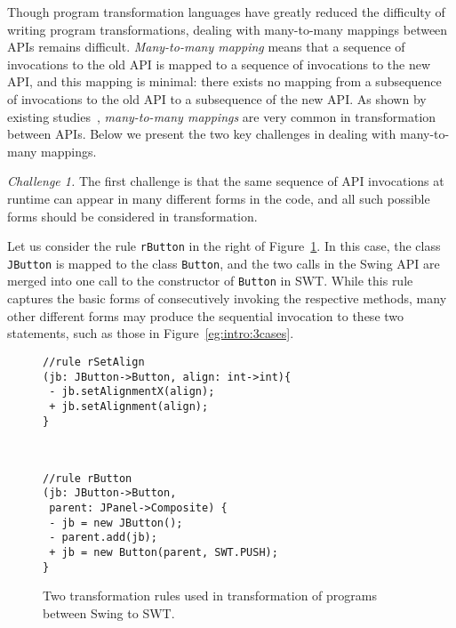 \documentclass[a4paper, USenglish]{lipics-v2016}
\newenvironment{smpage}[1]
{\begin{lrbox}{\fmbox}\begin{minipage}{#1}}
{\end{minipage}\end{lrbox}\usebox{\fmbox}}
\newcommand{\code}[1]{\texttt{\footnotesize #1}}
\theoremstyle{plain}
\begin{document}
Though program transformation languages have greatly reduced the difficulty of
writing program transformations, dealing with many-to-many mappings between APIs remains difficult. 
\emph{Many-to-many mapping} means that a
sequence of invocations to the old API is mapped to a sequence of
invocations to the new API, and this mapping is minimal: there exists no 
mapping from a subsequence of invocations to the old API to a
subsequence of the new API. As shown by existing studies~\cite{246,Bartolomei:2009:SAM:2127907.2127914},
\emph{many-to-many mappings} are very common in transformation between APIs.
Below we present the two key challenges in dealing with many-to-many mappings.

\textit{Challenge 1.} The first challenge is
  that the same sequence of API invocations at runtime can appear in many
  different forms in the code, and all such possible forms should be considered in transformation. 
 
Let us consider the rule
\code{rButton} in the right of Figure~\ref{running-rules}. In this case, the class \code{JButton} is mapped to the class \code{Button}, and the two calls in the Swing API are merged into one call to the constructor of \code{Button} in SWT.
While this rule captures the basic forms of consecutively
invoking the respective methods, many other different forms may produce
the sequential invocation to these two statements, such as those in Figure~\ref{eg:intro:3cases}.

\begin{figure}[t]
\begin{center}
\begin{smpage}{0.5\columnwidth}
\begin{lstlisting}[style=patl,frame=none,numbers=none,basicstyle=\scriptsize\ttfamily]
//rule rSetAlign
(jb: JButton->Button, align: int->int){
 - jb.setAlignmentX(align);
 + jb.setAlignment(align);
}
\end{lstlisting}
\end{smpage}
~
\begin{smpage}{0.42\columnwidth}
\begin{lstlisting}[style=patl,frame=none,numbers=none,basicstyle=\scriptsize\ttfamily]
//rule rButton
(jb: JButton->Button, 
 parent: JPanel->Composite) {
 - jb = new JButton();
 - parent.add(jb);
 + jb = new Button(parent, SWT.PUSH);
}
\end{lstlisting}
\end{smpage}
\end{center}
\vspace{-20pt}
\caption{Two transformation rules used in transformation of programs between Swing to SWT.}
\label{running-rules}
\vspace{-10pt}
\end{figure}
\end{document}
